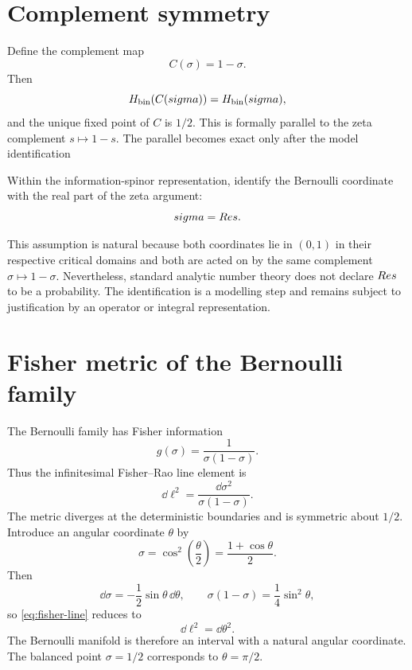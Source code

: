 \section{Complement symmetry}
Define the complement map
\begin{equation}
C(\sigma)=1-\sigma.
\end{equation}
Then
\begin{equation}
H_{\mathrm{bin}}(C(sigma))=H_{\mathrm{bin}}(sigma),
\end{equation}
and the unique fixed point of $C$ is $1/2$. This is formally parallel to the zeta complement $s\mapsto1-s$. The parallel becomes exact only after the model identification
\begin{assumption}
\label{ass:sigma}
Within the information-spinor representation, identify the Bernoulli coordinate with the real part of the zeta argument:
\begin{equation}
sigma=Re s.
\end{equation}
\end{assumption}

This assumption is natural because both coordinates lie in $(0,1)$ in their respective critical domains and both are acted on by the same complement $\sigma\mapsto1-\sigma$. Nevertheless, standard analytic number theory does not declare $Re s$ to be a probability. The identification is a modelling step and remains subject to justification by an operator or integral representation.

\section{Fisher metric of the Bernoulli family}
The Bernoulli family has Fisher information
\begin{equation}
g(\sigma)=\frac{1}{\sigma(1-\sigma)}.
\end{equation}
Thus the infinitesimal Fisher--Rao line element is
\begin{equation}
\dd \ell^2=\frac{\dd\sigma^2}{\sigma(1-\sigma)}.
\label{eq:fisher-line}
\end{equation}
The metric diverges at the deterministic boundaries and is symmetric about $1/2$. Introduce an angular coordinate $\theta$ by
\begin{equation}
\sigma=\cos^2\!\left(\frac{\theta}{2}\right)
=\frac{1+\cos\theta}{2}.
\label{eq:sigma-theta}
\end{equation}
Then
\begin{equation}
\dd\sigma=-\frac12\sin\theta\,\dd\theta,
\qquad
\sigma(1-\sigma)=\frac14\sin^2\theta,
\end{equation}
so \eqref{eq:fisher-line} reduces to
\begin{equation}
\dd \ell^2=\dd\theta^2.
\end{equation}
The Bernoulli manifold is therefore an interval with a natural angular coordinate. The balanced point $\sigma=1/2$ corresponds to $\theta=\pi/2$.

